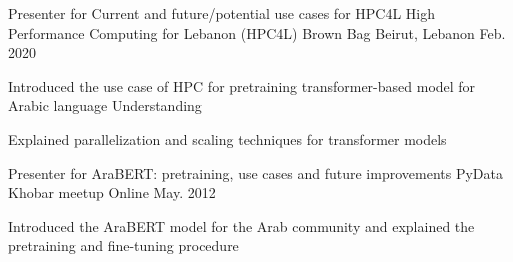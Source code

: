 

\begin{cventries}

  \cventry
    {Presenter for Current and future/potential use cases for HPC4L} %
    {High Performance Computing for Lebanon (HPC4L) Brown Bag} %
    {Beirut, Lebanon} %
    {Feb. 2020} %
    {
      \begin{cvitems} %
        \item {Introduced the use case of HPC for pretraining transformer-based model for Arabic language Understanding}
        \item {Explained parallelization and scaling techniques for transformer models}
      \end{cvitems}
    }

  \cventry
    {Presenter for AraBERT: pretraining, use cases and future improvements} %
    {PyData Khobar meetup} %
    {Online} %
    {May. 2012} %
    {
      \begin{cvitems} %
        \item {Introduced the AraBERT model for the Arab community and explained the pretraining and fine-tuning procedure}
      \end{cvitems}
    }

\end{cventries}
